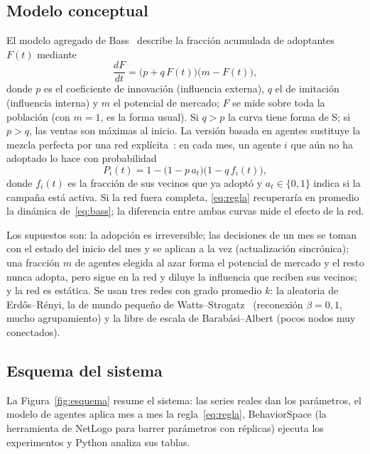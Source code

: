 \documentclass[runningheads]{llncs}
\begin{document}
\subsection{Modelo conceptual}

El modelo agregado de Bass~\cite{bass1969} describe la fracción acumulada de adoptantes $F(t)$ mediante
\begin{equation}
  \frac{dF}{dt} = \bigl(p + q\,F(t)\bigr)\bigl(m - F(t)\bigr),
  \label{eq:bass}
\end{equation}
donde $p$ es el coeficiente de innovación (influencia externa), $q$ el de imitación (influencia interna) y $m$ el potencial de mercado; $F$ se mide sobre toda la población (con $m=1$, es la forma usual). Si $q>p$ la curva tiene forma de S; si $p>q$, las ventas son máximas al inicio. La versión basada en agentes sustituye la mezcla perfecta por una red explícita~\cite{goldenberg2001}: en cada mes, un agente $i$ que aún no ha adoptado lo hace con probabilidad
\begin{equation}
  P_i(t) = 1 - \bigl(1 - p\,a_t\bigr)\bigl(1 - q\,f_i(t)\bigr),
  \label{eq:regla}
\end{equation}
donde $f_i(t)$ es la fracción de sus vecinos que ya adoptó y $a_t\in\{0,1\}$ indica si la campaña está activa. Si la red fuera completa, \eqref{eq:regla} recuperaría en promedio la dinámica de~\eqref{eq:bass}; la diferencia entre ambas curvas mide el efecto de la red.

Los supuestos son: la adopción es irreversible; las decisiones de un mes se toman con el estado del inicio del mes y se aplican a la vez (actualización sincrónica); una fracción $m$ de agentes elegida al azar forma el potencial de mercado y el resto nunca adopta, pero sigue en la red y diluye la influencia que reciben sus vecinos; y la red es estática. Se usan tres redes con grado promedio $k$: la aleatoria de Erdős--Rényi, la de mundo pequeño de Watts--Strogatz~\cite{watts1998} (reconexión $\beta=0{,}1$, mucho agrupamiento) y la libre de escala de Barabási--Albert (pocos nodos muy conectados).

\subsection{Esquema del sistema}

La Figura~\ref{fig:esquema} resume el sistema: las series reales dan los parámetros, el modelo de agentes aplica mes a mes la regla~\eqref{eq:regla}, BehaviorSpace (la herramienta de NetLogo para barrer parámetros con réplicas) ejecuta los experimentos y Python analiza sus tablas.
\end{document}
